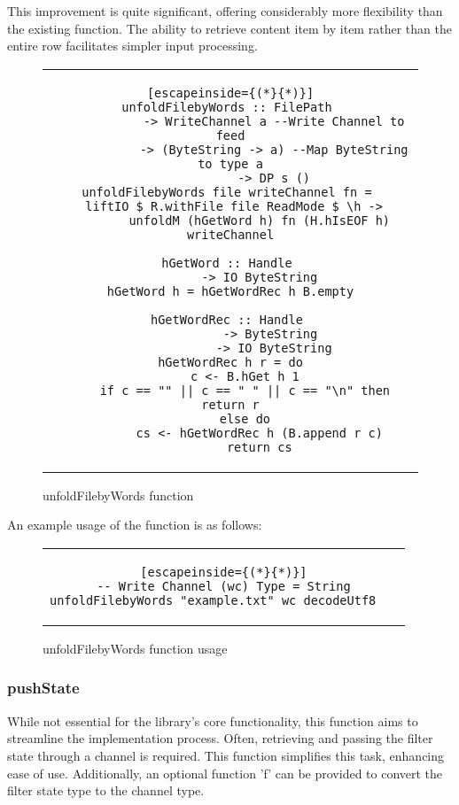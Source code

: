This improvement is quite significant, offering considerably more flexibility than the existing function.
The ability to retrieve content item by item rather than the entire row facilitates simpler input processing.
\begin{figure}[H]
    \begin{tabular}{c}
        \begin{lstlisting}[escapeinside={(*}{*)}]
unfoldFilebyWords :: FilePath 
            -> WriteChannel a --Write Channel to feed
            -> (ByteString -> a) --Map ByteString to type a
            -> DP s ()
unfoldFilebyWords file writeChannel fn = 
  liftIO $ R.withFile file ReadMode $ \h -> 
        unfoldM (hGetWord h) fn (H.hIsEOF h) writeChannel

hGetWord :: Handle 
        -> IO ByteString
hGetWord h = hGetWordRec h B.empty

hGetWordRec :: Handle 
            -> ByteString 
            -> IO ByteString
hGetWordRec h r = do
    c <- B.hGet h 1
    if c == "" || c == " " || c == "\n" then return r
    else do
        cs <- hGetWordRec h (B.append r c)
        return cs
        \end{lstlisting}
    \end{tabular}
    \caption{unfoldFilebyWords function}
    \label{fig:HC22}
\end{figure}

An example usage of the function is as follows:

\begin{figure}[H]
    \begin{tabular}{c}
        \begin{lstlisting}[escapeinside={(*}{*)}]
-- Write Channel (wc) Type = String
unfoldFilebyWords "example.txt" wc decodeUtf8	
        \end{lstlisting}
    \end{tabular}
    \caption{unfoldFilebyWords function usage}
    \label{fig:HC22b}
\end{figure}

\subsubsection*{pushState}
While not essential for the library's core functionality, this function aims to streamline the implementation process.
Often, retrieving and passing the filter state through a channel is required.
This function simplifies this task, enhancing ease of use.
Additionally, an optional function 'f' can be provided to convert the filter state type to the channel type.

